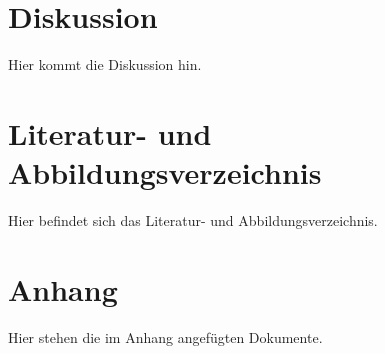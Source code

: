 \documentclass[11pt]{article}
\begin{document}
\section{Diskussion}
Hier kommt die Diskussion hin.
\section{Literatur- und Abbildungsverzeichnis}
Hier befindet sich das Literatur- und Abbildungsverzeichnis.
\section{Anhang}
Hier stehen die im Anhang angefügten Dokumente.
\end{document}
